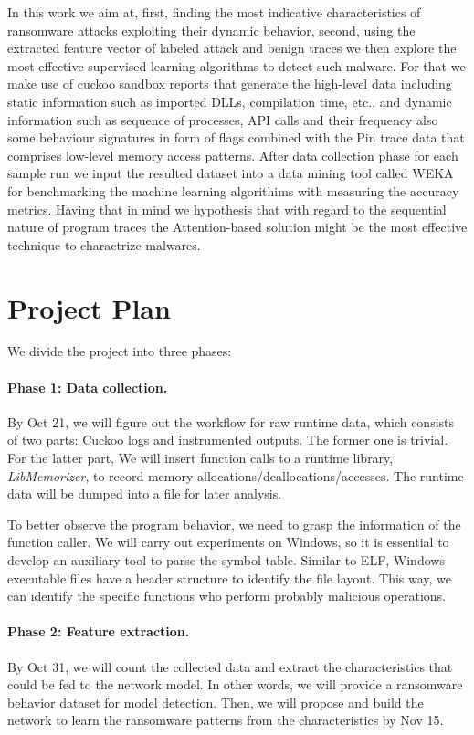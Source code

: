 \documentclass[letterpaper,twocolumn,10pt]{article}
\begin{document}
In this work we aim at, first, finding the most indicative characteristics of ransomware attacks exploiting their dynamic behavior, second, using the extracted feature vector of labeled attack and benign traces we then explore the most effective supervised learning algorithms to detect such malware.
For that we make use of cuckoo sandbox reports that generate the high-level data including static information such as imported DLLs, compilation time, etc., and dynamic information such as sequence of processes, API calls and their frequency also some behaviour signatures in form of flags combined with the Pin trace data that comprises low-level memory access patterns. After data collection phase for each sample run we input the resulted dataset into a data mining tool called WEKA for benchmarking the machine learning algorithims with measuring the accuracy metrics. 
Having that in mind we hypothesis that with regard to the sequential nature of program traces the Attention-based solution might be the most effective technique to charactrize malwares.

\section{Project Plan}

We divide the project into three phases:

\paragraph{Phase 1: Data collection.}

By Oct 21, we will figure out the workflow for raw runtime data, which consists of two parts: Cuckoo logs and instrumented outputs.
The former one is trivial. For the latter part, We will insert function calls to a runtime library, \textit{LibMemorizer}, to record memory allocations/deallocations/accesses. The runtime data will be dumped into a file for later analysis.

To better observe the program behavior, we need to grasp the information of the function caller.
We will carry out experiments on Windows, so it is essential to develop an auxiliary tool to parse the symbol table.
Similar to ELF, Windows executable files have a header structure to identify the file layout.
This way, we can identify the specific functions who perform probably malicious operations.

\paragraph{Phase 2: Feature extraction.} By Oct 31, we will count the collected data and extract the characteristics that could be fed to the network model.
In other words, we will provide a ransomware behavior dataset for model detection.
Then, we will propose and build the network to learn the ransomware patterns from the characteristics by Nov 15.
\end{document}
